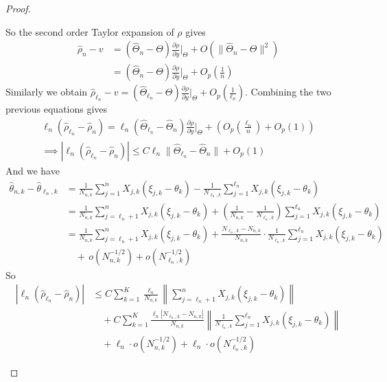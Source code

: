 \documentclass[11pt]{article}
\theoremstyle{plain}
\theoremstyle{definition}
\begin{document}
\begin{appendix}
\begin{proof}
\begin{enumerate}[label=(\roman*)]
		So the second order Taylor expansion of \(\rho\) gives
		\begin{align}
			\hat{\rho}_n - v  &= (\hat{\Theta}_n-\Theta)\frac{\partial \rho}{\partial y}\Big|_{\Theta} + O(\|\hat{\Theta}_n-\Theta\|^2) \\
			&= (\hat{\Theta}_n-\Theta)\frac{\partial \rho}{\partial y}\Big|_{\Theta} + O_p\left(\frac{1}{n}\right) \label{eq:approx-rho-Op}
		\end{align}
		Similarly we obtain \(		\hat{\rho}_{\ell_n} - v = (\hat{\Theta}_{\ell_n}-\Theta)\frac{\partial \rho}{\partial y}\Big|_{\Theta} + O_p\left(\frac{1}{\ell_n}\right)
		\).	Combining the two previous equations gives
		\begin{eqnarray*}
			\ell_n(\hat{\rho}_{\ell_n}-\hat{\rho}_n) = \ell_n(\hat{\Theta}_{\ell_n}-\hat{\Theta}_n)\frac{\partial \rho}{\partial y}\Big|_{\Theta} + \left(O_p\left(\frac{\ell_n}{n}\right)+O_p(1)\right) \\
			\implies |\ell_n(\hat{\rho}_{\ell_n}-\hat{\rho}_n)| \le C \ell_n \|\hat{\Theta}_{\ell_n}-\hat{\Theta}_n\| + O_p(1)
		\end{eqnarray*}
		And we have	
		\begin{align*}
			\hat{\theta}_{n,k}-\hat{\theta}_{\ell_n,k} &= \frac{1}{N_{n,k}}\sum_{j=1}^{n}X_{j,k}(\xi_{j,k}-\theta_k)-\frac{1}{N_{\ell_n,k}}\sum_{j=1}^{\ell_n}X_{j,k}(\xi_{j,k}-\theta_k)\\
			&= \frac{1}{N_{n,k}}\sum_{j=\ell_n+1}^{n} X_{j,k}(\xi_{j,k}-\theta_k) + \left(\frac{1}{N_{n,k}} - \frac{1}{N_{\ell_n,k}}\right)\sum_{j=1}^{\ell_n}X_{j,k}(\xi_{j,k}-\theta_k)\\[8pt]
			&= \frac{1}{N_{n,k}}\sum_{j=\ell_n+1}^{n}X_{j,k}(\xi_{j,k}-\theta_k) + \frac{N_{\ell_n,k}-N_{n,k}}{N_{n,k}}\cdot\frac{1}{N_{\ell_n,k}}\sum_{j=1}^{\ell_n}X_{j,k}(\xi_{j,k}-\theta_k)\\[8pt]
			&\quad +\, o\left(N_{n,k}^{-1/2}\right) + o\left(N_{\ell_n,k}^{-1/2}\right)
		\end{align*}
		So
		\begin{align*}
			|\ell_n(\hat{\rho}_{\ell_n}-\hat{\rho}_n)| &\le C\sum_{k=1}^{K}\frac{\ell_n}{N_{n,k}}\left\|\sum_{j=\ell_n+1}^{n}X_{j,k}(\xi_{j,k}-\theta_k)\right\|\\
			&\quad + C\sum_{k=1}^{K}\frac{\ell_n|N_{\ell_n,k}-N_{n,k}|}{N_{n,k}}\left\|\frac{1}{N_{\ell_n,k}}\sum_{j=1}^{\ell_n}X_{j,k}(\xi_{j,k}-\theta_k)\right\|\\
			&\quad + \ell_n \cdot o\left(N_{n,k}^{-1/2}\right) + \ell_n \cdot o\left(N_{\ell_n,k}^{-1/2}\right)
		\end{align*}

\end{enumerate}
\end{proof}
\end{appendix}
\end{document}
